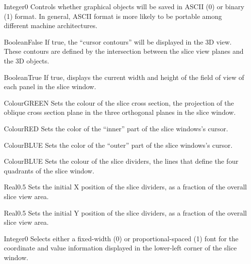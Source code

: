  {Integer}{0} {Controls whether graphical
 objects will be saved in ASCII (0) or binary (1) format. In general,
 ASCII format is more likely to be portable among different machine
 architectures.}{}




{Boolean}{False}
{If true, the ``cursor contours'' will be displayed in the 3D
  view. These contours are defined by the intersection between the slice
  view planes and the 3D objects.}{}

{Boolean}{True}
{If true, displays the current width and height of the field of view of each panel in the slice window.}{}

{Colour}{GREEN}
{Sets the colour of the slice cross section, the projection of the oblique cross section plane in the three orthogonal planes in the slice window.}{}

{Colour}{RED}
{Sets the color of the ``inner'' part of the slice windows's cursor.}{}

{Colour}{BLUE}
{Sets the color of the ``outer'' part of the slice windows's cursor.}{}

{Colour}{BLUE}
{Sets the colour of the slice dividers, the lines that define the four quadrants of the slice window.}{}

{Real}{0.5}
{Sets the initial X position of the slice dividers, as a fraction of the overall slice view area.}{}

{Real}{0.5}
{Sets the initial Y position of the slice dividers, as a fraction of the overall slice view area.}{}

{Integer}{0}
{Selects either a fixed-width (0) or proportional-spaced (1) font for the
coordinate and value information displayed in the lower-left corner of the slice window.}{}

